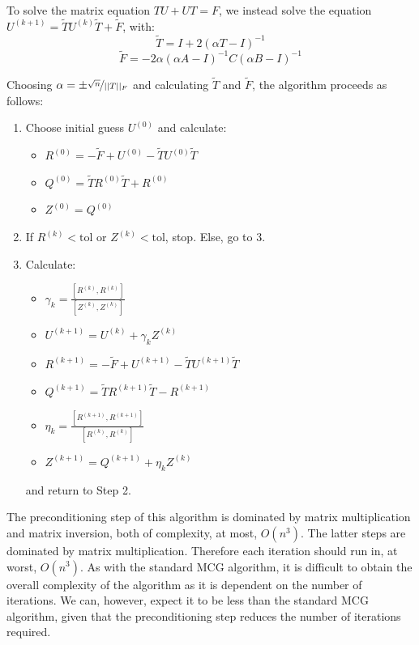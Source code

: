\documentclass[11pt]{article}
\numberwithin{equation}{section}
\begin{document}
To solve the matrix equation $TU + UT = F$, we instead solve the equation $U^{(k+1)} = \widetilde{T}U^{(k)} \widetilde{T} + \widetilde{F}$, with:
\[ \widetilde{T} = I + 2(\alpha T - I)^{-1} \]
\[ \widetilde{F} = -2\alpha(\alpha A - I)^{-1} C (\alpha B - I)^{-1} \]

Choosing $\alpha = \pm \nicefrac{\sqrt{n}}{||T||_F}$ and calculating $\widetilde{T}$ and $\widetilde{F}$, the algorithm proceeds as follows:
\begin{enumerate}
\item Choose initial guess $U^{(0)}$ and calculate:
	\begin{itemize}
	\item $R^{(0)} = -\widetilde{F} + U^{(0)} - \widetilde{T}U^{(0)} \widetilde{T}$
	\item $Q^{(0)} = \widetilde{T} R^{(0)}\widetilde{T} + R^{(0)}$
	\item $Z^{(0)} = Q^{(0)}$
	\end{itemize}
\item If $R^{(k)} < \text{tol}$ or $Z^{(k)} < \text{tol}$, stop. Else, go to 3.
\item Calculate:
	\begin{itemize}
	\item $ \gamma_k = \frac{[R^{(k)}, R^{(k)}]}{[Z^{(k)}, Z^{(k)}]}$
	\item $U^{(k+1)} = U^{(k)} + \gamma_k Z^{(k)} $
	\item $R^{(k+1)} = -\widetilde{F} + U^{(k+1)} - \widetilde{T}U^{(k+1)} \widetilde{T}$
	\item $Q^{(k+1)} = \widetilde{T} R^{(k+1)}\widetilde{T} - R^{(k+1)}$
	\item $\eta_k = \frac{[R^{(k+1)}, R^{(k+1)}]}{[R^{(k)}, R^{(k)}]}$ 
	\item $Z^{(k+1)} = Q^{(k+1)} + \eta_k Z^{(k)}$
	\end{itemize}
	and return to Step 2.
\end{enumerate}

The preconditioning step of this algorithm is dominated by matrix multiplication and matrix inversion, both of complexity, at most, $O(n^3)$. The latter steps are dominated by matrix multiplication. Therefore each iteration should run in, at worst, $O(n^3)$. As with the standard MCG algorithm, it is difficult to obtain the overall complexity of the algorithm as it is dependent on the number of iterations. We can, however, expect it to be less than the standard MCG algorithm, given that the preconditioning step reduces the number of iterations required.
\end{document}
